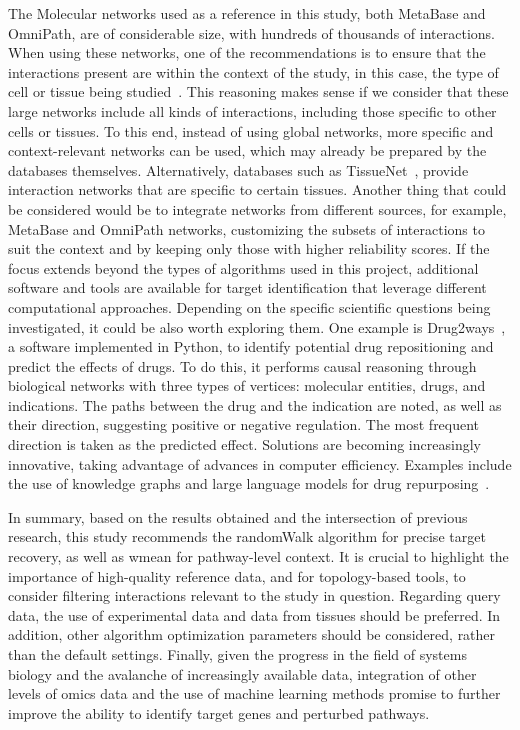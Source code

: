 The \gls{Molecular network}s used as a reference in this study, both MetaBase and OmniPath, are of considerable size, with hundreds of thousands of interactions. 
When using these networks, one of the recommendations is to ensure that the interactions present are within the context of the study, in this case, the type of cell or tissue being studied~\cite{RN38}. 
This reasoning makes sense if we consider that these large networks include all kinds of interactions, including those specific to other cells or tissues. 
To this end, instead of using global networks, more specific and context-relevant networks can be used, which may already be prepared by the databases themselves. 
Alternatively, databases such as TissueNet~\cite{RN137}, provide interaction networks that are specific to certain tissues. 
Another thing that could be considered would be to integrate networks from different sources, for example, MetaBase and OmniPath networks, customizing the subsets of interactions to suit the context and by keeping only those with higher reliability scores. 
If the focus extends beyond the types of algorithms used in this project, additional software and tools are available for target identification that leverage different computational approaches. 
Depending on the specific scientific questions being investigated, it could be also worth exploring them. One example is Drug2ways~\cite{RN132}, a software implemented in Python, to identify potential drug repositioning and predict the effects of drugs. 
To do this, it performs causal reasoning through biological networks with three types of vertices: molecular entities, drugs, and indications. 
The paths between the drug and the indication are noted, as well as their direction, suggesting positive or negative regulation. The most frequent direction is taken as the predicted effect. 
Solutions are becoming increasingly innovative, taking advantage of advances in computer efficiency. 
Examples include the use of knowledge graphs and large language models for drug repurposing~\cite{RN163}. 

In summary, based on the results obtained and the intersection of previous research, this study recommends the randomWalk algorithm for precise target recovery, as well as wmean for pathway-level context. 
It is crucial to highlight the importance of high-quality reference data, and for topology-based tools, to consider filtering interactions relevant to the study in question. 
Regarding query data, the use of experimental data and data from tissues should be preferred. 
In addition, other algorithm optimization parameters should be considered, rather than the default settings. 
Finally, given the progress in the field of systems biology and the avalanche of increasingly available data, integration of other levels of omics data and the use of machine learning methods promise to further improve the ability to identify target genes and perturbed pathways.
